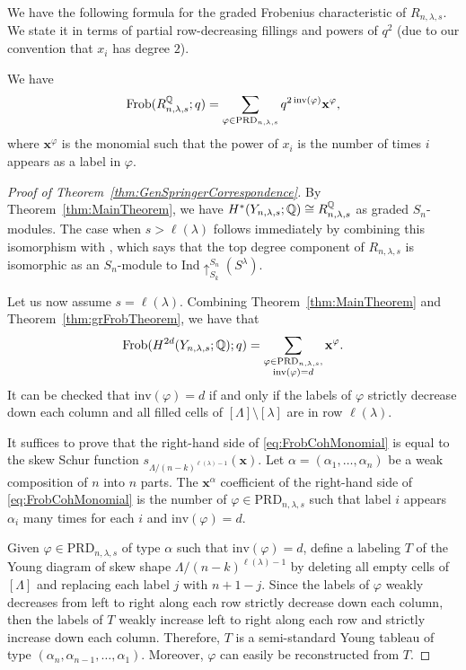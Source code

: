 \documentclass[12pt]{amsart}
\newcommand{\Frob}{\mathrm{Frob}}
\newcommand{\la}{\lambda}
\newcommand{\inv}{\mathrm{inv}}
\newcommand{\bx}{\mathbf{x}}
\begin{document}
We have the following formula for the graded Frobenius characteristic of $R_{n,\la,s}$. We state it in terms of partial row-decreasing fillings and powers of $q^2$ (due to our convention that $x_i$ has degree $2$).
\begin{theorem}\label{thm:grFrobTheorem}
  We have
  \[
    \Frob(R_{n,\la,s}^\bQ;q) = \sum_{\varphi \in \mathrm{PRD}_{n,\la,s}} q^{2\,\inv(\varphi)}\bx^\varphi,
  \]
  where $\bx^\varphi$ is the monomial such that the power of $x_i$ is the number of times $i$ appears as a label in $\varphi$.
\end{theorem}


\begin{proof}[Proof of Theorem~\ref{thm:GenSpringerCorrespondence}]
  By Theorem~\ref{thm:MainTheorem}, we have $H^*(Y_{n,\la,s};\bQ) \cong R_{n,\la,s}^\bQ$ as graded $S_n$-modules.
The case when $s>\ell(\lambda)$ follows immediately by combining this isomorphism with \cite[Corollary 3.3.15]{GriffinThesis}, which says that the top degree component of $R_{n,\lambda,s}$ is isomorphic as an $S_n$-module to $\mathrm{Ind}\!\uparrow_{S_k}^{S_n}\!(S^\lambda)$.

Let us now assume $s=\ell(\lambda)$. Combining Theorem~\ref{thm:MainTheorem} and Theorem~\ref{thm:grFrobTheorem}, we have that
\begin{align}\label{eq:FrobCohMonomial}
    \Frob(H^{2d}(Y_{n,\lambda,s};\bQ);q) = \sum_{\substack{\varphi \in \mathrm{PRD}_{n,\lambda,s},\\ \mathrm{inv}(\varphi)=d}} \mathbf{x}^\varphi.
\end{align}
It can be checked that $\inv(\varphi) = d$  if and only if the labels of $\varphi$ strictly decrease down each column and all filled cells of $[\Lambda]\setminus [\la]$ are in row $\ell(\lambda)$.

It suffices to prove that the right-hand side of \eqref{eq:FrobCohMonomial} is equal to the skew Schur function $s_{\Lambda/(n-k)^{\ell(\la)-1}}(\bx)$. Let $\alpha = (\alpha_1,\dots, \alpha_n)$ be a weak composition of $n$ into $n$ parts.
The $\bx^\alpha$ coefficient of the right-hand side of \eqref{eq:FrobCohMonomial} is the number of $\varphi\in \mathrm{PRD}_{n,\la,s}$ such that label $i$ appears $\alpha_i$ many times for each $i$ and $\mathrm{inv}(\varphi) = d$. 

Given $\varphi\in \mathrm{PRD}_{n,\la,s}$ of type $\alpha$ such that $\mathrm{inv}(\varphi) = d$, define a labeling $T$ of the Young diagram of skew shape $\Lambda/(n-k)^{\ell(\lambda)-1}$ by deleting all empty cells of $[\Lambda]$ and replacing each label $j$ with $n+1-j$. Since the labels of $\varphi$ weakly decreases from left to right along each row  strictly decrease down each column, then the labels of $T$ weakly increase left to right along each row and strictly increase down each column. Therefore, $T$ is a semi-standard Young tableau of type $(\alpha_n,\alpha_{n-1},\dots, \alpha_1)$. Moreover, $\varphi$ can easily be reconstructed from $T$. 


\end{proof}
\end{document}
